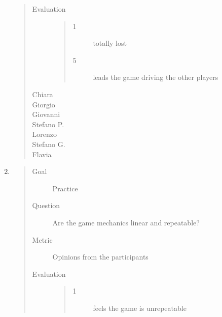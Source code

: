 \documentclass[letterpaper,10pt,italian]{sphinxmanual}
\begin{document}
\begin{enumerate}
\begin{quote}
\begin{description}
\item[{Evaluation}] \leavevmode\begin{quote}\begin{description}
\item[{1}] \leavevmode
\sphinxAtStartPar
totally lost

\item[{5}] \leavevmode
\sphinxAtStartPar
leads the game driving the other players

\end{description}\end{quote}

\item[{Chiara}] \leavevmode
{}

\item[{Giorgio}] \leavevmode
{}

\item[{Giovanni}] \leavevmode
{}

\item[{Stefano P.}] \leavevmode
{}

\item[{Lorenzo}] \leavevmode
{}

\item[{Stefano G.}] \leavevmode
{}

\item[{Flavia}] \leavevmode
{}

\end{description}\end{quote}

\item {} \begin{quote}\begin{description}
\item[{Goal}] \leavevmode
\sphinxAtStartPar
Practice

\item[{Question}] \leavevmode
\sphinxAtStartPar
Are the game mechanics linear and repeatable?

\item[{Metric}] \leavevmode
\sphinxAtStartPar
Opinions from the participants

\item[{Evaluation}] \leavevmode\begin{quote}\begin{description}
\item[{1}] \leavevmode
\sphinxAtStartPar
feels the game is unrepeatable


\end{description}
\end{quote}
\end{description}
\end{quote}
\end{enumerate}
\end{document}
